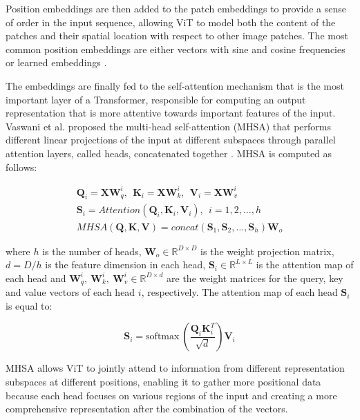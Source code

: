 \documentclass[10pt,twocolumn,letterpaper]{article}
\begin{document}
Position embeddings are then added to the patch embeddings to provide a sense of order in the input sequence, allowing ViT to model both the content of the patches and their spatial location with respect to other image patches. The most common position embeddings are either vectors with sine and cosine frequencies \cite{Author3} or learned embeddings \cite{Author5,Author32}.

The embeddings are finally fed to the self-attention mechanism that is the most important layer of a Transformer, responsible for computing an output representation that is more attentive towards important features of the input. Vaswani et al. proposed the multi-head self-attention (MHSA) that performs different linear projections of the input at different subspaces through parallel attention layers, called heads, concatenated together \cite{Author29}. MHSA is computed as follows:

\begin{gather}
    \textbf{Q}_i = \textbf{XW}_{q}^i, ~~ \textbf{K}_i = \textbf{XW}_{k}^i, ~~ \textbf{V}_i = \textbf{XW}_{v}^i\\
    \textbf{S}_i = Attention(\textbf{Q}_i, \textbf{K}_i, \textbf{V}_i),~~ i = 1, 2, \dots, h\\
    MHSA(\textbf{Q},\textbf{K},\textbf{V}) = concat(\textbf{S}_1, \textbf{S}_2, \dots, \textbf{S}_h)\textbf{W}_{o}
    \label{eq:mhsa}
\end{gather}

where $h$ is the number of heads, $\textbf{W}_o \in \mathbb{R}^{D\times D}$ is the weight projection matrix, $d=D/h$ is the feature dimension in each head, $\textbf{S}_i \in \mathbb{R}^{L \times L}$ is the attention map of each head and $\textbf{W}_{q}^i,~\textbf{W}_{k}^i,~\textbf{W}_{v}^i \in \mathbb{R}^{D\times d}$ are the weight matrices for the query, key and value vectors of each head $i$, respectively. The attention map of each head $\textbf{S}_i$ is equal to:

\begin{equation}
    \textbf{S}_i = \mathrm{softmax}~(\frac{\textbf{Q}_i \textbf{K}_i^T}{\sqrt{d}})\textbf{V}_i
    \label{eq:sdp}
\end{equation}

MHSA allows ViT to jointly attend to information from different representation subspaces at different positions, enabling it to gather more positional data because each head focuses on various regions of the input and creating a more comprehensive representation after the combination of the vectors.
\end{document}

